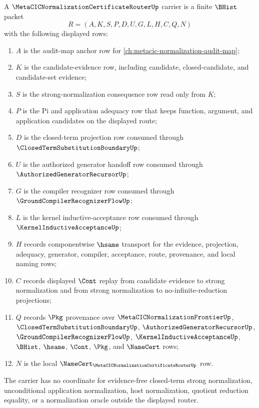 \begin{definition}
\label{def:metacic-normalization-certificate-router-carrier}
A $\MetaCICNormalizationCertificateRouterUp$ carrier is a finite $\BHist$ packet
$$
R=(A,K,S,P,D,U,G,L,H,C,Q,N)
$$
with the following displayed rows:
\begin{enumerate}
\item $A$ is the audit-map anchor row for \autoref{ch:metacic-normalization-audit-map};
\item $K$ is the candidate-evidence row, including candidate, closed-candidate, and candidate-set evidence;
\item $S$ is the strong-normalization consequence row read only from $K$;
\item $P$ is the Pi and application adequacy row that keeps function, argument, and application candidates on the displayed route;
\item $D$ is the closed-term projection row consumed through $\ClosedTermSubstitutionBoundaryUp$;
\item $U$ is the authorized generator handoff row consumed through $\AuthorizedGeneratorRecursorUp$;
\item $G$ is the compiler recognizer row consumed through $\GroundCompilerRecognizerFlowUp$;
\item $L$ is the kernel inductive-acceptance row consumed through $\KernelInductiveAcceptanceUp$;
\item $H$ records componentwise $\hsame$ transport for the evidence, projection, adequacy, generator, compiler, acceptance, route, provenance, and local naming rows;
\item $C$ records displayed $\Cont$ replay from candidate evidence to strong normalization and from strong normalization to no-infinite-reduction projections;
\item $Q$ records $\Pkg$ provenance over $\MetaCICNormalizationFrontierUp$, $\ClosedTermSubstitutionBoundaryUp$, $\AuthorizedGeneratorRecursorUp$, $\GroundCompilerRecognizerFlowUp$, $\KernelInductiveAcceptanceUp$, $\BHist$, $\hsame$, $\Cont$, $\Pkg$, and $\NameCert$ rows;
\item $N$ is the local $\NameCert_{\MetaCICNormalizationCertificateRouterUp}$ row.
\end{enumerate}
The carrier has no coordinate for evidence-free closed-term strong normalization, unconditional application normalization, host normalization, quotient reduction equality, or a normalization oracle outside the displayed router.
\end{definition}


